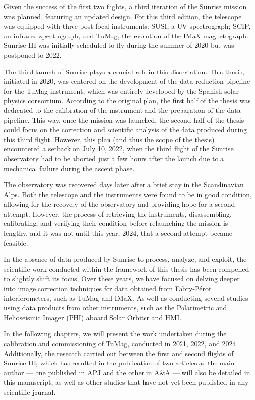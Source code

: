 \documentclass[12pt]{mythesis}
\begin{document}
Given the success of the first two flights, a third iteration of the Sunrise mission was planned, featuring an updated design. For this third edition, the telescope was equipped with three post-focal instruments: SUSI, a UV spectrograph; SCIP, an infrared spectrograph; and TuMag, the evolution of the IMaX magnetograph. Sunrise III was initially scheduled to fly during the summer of 2020 but was postponed to 2022.

The third launch of Sunrise plays a crucial role in this dissertation. This thesis, initiated in 2020, was centered on the development of the data reduction pipeline for the TuMag instrument, which was entirely developed by the Spanish solar physics consortium. According to the original plan, the first half of the thesis was dedicated to the calibration of the instrument and the preparation of the data pipeline. This way, once the mission was launched, the second half of the thesis could focus on the correction and scientific analysis of the data produced during this third flight. However, this plan (and thus the scope of the thesis) encountered a setback on July 10, 2022, when the third flight of the Sunrise observatory had to be aborted just a few hours after the launch due to a mechanical failure during the ascent phase.

The observatory was recovered days later after a brief stay in the Scandinavian Alps. Both the telescope and the instruments were found to be in good condition, allowing for the recovery of the observatory and providing hope for a second attempt. However, the process of retrieving the instruments, disassembling, calibrating, and verifying their condition before relaunching the mission is lengthy, and it was not until this year, 2024, that a second attempt became feasible.

In the absence of data produced by Sunrise to process, analyze, and exploit, the scientific work conducted within the framework of this thesis has been compelled to slightly shift its focus. Over these years, we have focused on delving deeper into image correction techniques for data obtained from Fabry-Pérot interferometers, such as TuMag and IMaX. As well as conducting several studies using data products from other instruments, such as the Polarimetric and Helioseismic Imager (PHI) aboard Solar Orbiter and HMI. 

In the following chapters, we will present the work undertaken during the calibration and commissioning of TuMag, conducted in 2021, 2022, and 2024. Additionally, the research carried out between the first and second flights of Sunrise III, which has resulted in the publication of two articles as the main author — one published in APJ and the other in A\&A — will also be detailed in this manuscript, as well as other studies that have not yet been published in any scientific journal. 
\end{document}
